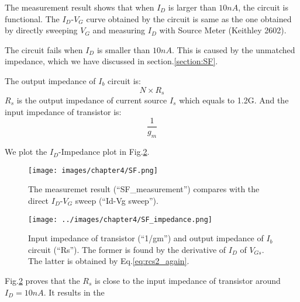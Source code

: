 The measurement result shows that when $I_D$ is larger than $10n A$, the circuit is functional.
The $I_D$-$V_G$ curve obtained by the circuit is same as the one obtained by directly sweeping $V_G$ and measuring $I_D$ with Source Meter (Keithley 2602).

The circuit fails when $I_D$ is smaller than $10n A$.
This is caused by the unmatched impedance, which we have discussed in section.\ref{section:SF}.

The output impedance of $I_b$ circuit is:
\begin{equation} \label{eq:rcs2_again}
    N\times R_s
\end{equation}
$R_s$ is the output impedance of current source $I_s$ which equals to 1.2G\Omega.
And the input impedance of transistor is:
\begin{equation} \label{eq:rsf2_again}
    \frac{1}{g_m}
\end{equation}

We plot the $I_D$-Impedance plot in Fig.\ref{fig:SF_imp}.


 \begin{figure}[!htbp]
    \centering
    \texttt{[image: images/chapter4/SF.png]}
    \caption{The measuremet result (``SF\_measurement'') compares with the direct $I_D$-$V_G$ sweep (``Id-Vg sweep'').}
    \label{fig:SF_result}
\end{figure}

\begin{figure}[!htbp]
   \centering
   \texttt{[image: ../images/chapter4/SF\_impedance.png]}
   \caption{Input impedance of transistor (``1/gm'') and output impedance of $I_b$ circuit (``Rs''). The former is found by the derivative of $I_D$ of $V_{Gs}$. The latter is obtained by Eq.\ref{eq:rcs2_again}.}
   \label{fig:SF_imp}
\end{figure}

Fig.\ref{fig:SF_imp} proves that the $R_s$ is close to the input impedance of transistor around $I_D = 10n A$.
It results in the  


